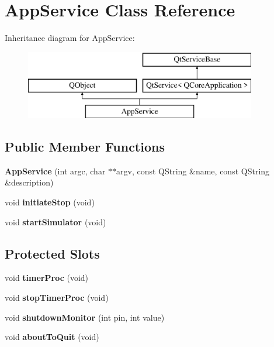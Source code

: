 \hypertarget{class_app_service}{}\section{App\+Service Class Reference}
\label{class_app_service}
Inheritance diagram for App\+Service\+:\begin{figure}[H]
\begin{center}
\leavevmode
\includegraphics[height=3.000000cm]{class_app_service}
\end{center}
\end{figure}
\subsection*{Public Member Functions}
\begin{DoxyCompactItemize}
\item 
\mbox{\label{class_app_service_a1b8bee1f7ab6d64ccfb9f23ff716a850}} 
{\bfseries App\+Service} (int argc, char $\ast$$\ast$argv, const Q\+String \&name, const Q\+String \&description)
\item 
\mbox{\label{class_app_service_ace4bde07e05766553435a751b917d903}} 
void {\bfseries initiate\+Stop} (void)
\item 
\mbox{\label{class_app_service_a63c7beff040e1cf6f33ad53c85824aac}} 
void {\bfseries start\+Simulator} (void)
\end{DoxyCompactItemize}
\subsection*{Protected Slots}
\begin{DoxyCompactItemize}
\item 
\mbox{\label{class_app_service_a21368cb3a7a25ef34d78138d14434fea}} 
void {\bfseries timer\+Proc} (void)
\item 
\mbox{\label{class_app_service_aea5d544b09bb238e36d1ce86726063e7}} 
void {\bfseries stop\+Timer\+Proc} (void)
\item 
\mbox{\label{class_app_service_aebb27134691e5afb7ebe770c258a4295}} 
void {\bfseries shutdown\+Monitor} (int pin, int value)
\item 
\mbox{\label{class_app_service_ae3ae8f61a6e545232cbcf12d4009c882}} 
void {\bfseries about\+To\+Quit} (void)
\end{DoxyCompactItemize}
